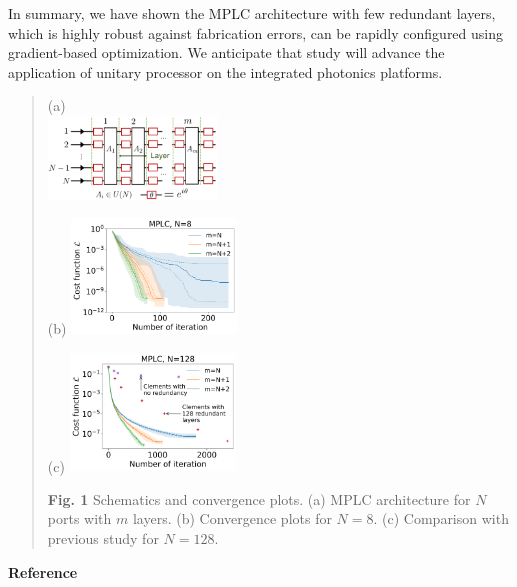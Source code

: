 \documentclass{article}
\begin{document}
In summary, we have shown the MPLC architecture with few redundant layers, which is highly robust against fabrication errors, can be rapidly configured using gradient-based optimization. We anticipate that study will advance the application of unitary processor on the integrated photonics platforms.
\begin{quotation}
\vspace{-0.2ex}
\begin{minipage}[b]{0.33\linewidth}
  \centering
  (a)
  \vspace{0.25cm}\\
  \includegraphics[width=4.5cm]{MPLC.png}
  \vspace{0.6cm}
\end{minipage}
\begin{minipage}[b]{0.31\linewidth}
  \centering
  (b)
  \includegraphics[width=4.4cm]{MPLC_N8.png}
\end{minipage}
\begin{minipage}[b]{0.31\linewidth}
  \centering
  (c)
  \includegraphics[width=4.4cm]{comparison.png}
\end{minipage}
\noindent\footnotesize\textbf{Fig. 1}
  Schematics and convergence plots. (a) MPLC architecture for $N$ ports with $m$ layers. (b) Convergence plots for $N=8$. (c) Comparison with previous study for $N=128$.
\end{quotation}

\setlength\parindent{0pt}\vspace{0ex}
\textbf{Reference}
\end{document}
